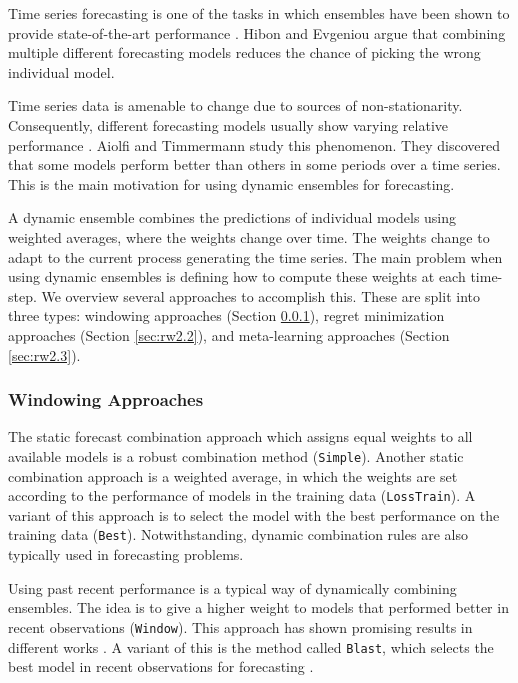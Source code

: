 \documentclass[smallcondensed]{svjour3}
\begin{document}
Time series forecasting is one of the tasks in which ensembles have been shown to provide state-of-the-art performance \cite{bates1969combination,cerqueira2019arbitrage,oreshkin2019n}. Hibon and Evgeniou \cite{hibon2005combine} argue that combining multiple different forecasting models reduces the chance of picking the wrong individual model. 

Time series data is amenable to change due to sources of non-stationarity. Consequently, different forecasting models usually show varying relative performance \cite{aiolfi2006persistence}. Aiolfi and Timmermann study this phenomenon. They discovered that some models perform better than others in some periods over a time series. This is the main motivation for using dynamic ensembles for forecasting.

A dynamic ensemble combines the predictions of individual models using weighted averages, where the weights change over time. The weights change to adapt to the current process generating the time series. The main problem when using dynamic ensembles is defining how to compute these weights at each time-step. We overview several approaches to accomplish this. These are split into three types:
windowing approaches (Section \ref{sec:rw2.1}), regret minimization approaches (Section \ref{sec:rw2.2}), and meta-learning approaches (Section \ref{sec:rw2.3}).

\subsubsection{Windowing Approaches}\label{sec:rw2.1}

The static forecast combination approach which assigns equal weights to all available models is a robust combination method \cite{clemen1986combining} (\texttt{Simple}). Another static combination approach is a weighted average, in which the weights are set
according to the performance of models in the training data (\texttt{LossTrain}). A variant of this approach is to select the model with the best performance on the training data (\texttt{Best}). Notwithstanding, dynamic combination rules are also typically used in forecasting problems.

Using past recent performance is a typical way of dynamically combining ensembles. The idea is to give a higher weight to models that performed better in recent observations (\texttt{Window}).
This approach has shown promising results in different works \cite{newbold1974experience,cerqueira2017dynamic}.
A variant of this is the method called \texttt{Blast}, which selects the best model in recent observations for forecasting \cite{Blast}.
\end{document}
